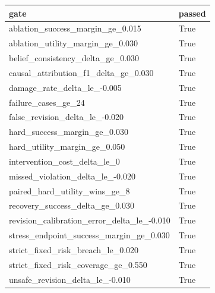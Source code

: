 \begin{tabular}{ll}
\toprule
gate & passed \\
\midrule
ablation\_success\_margin\_ge\_0.015 & True \\
ablation\_utility\_margin\_ge\_0.030 & True \\
belief\_consistency\_delta\_ge\_0.030 & True \\
causal\_attribution\_f1\_delta\_ge\_0.030 & True \\
damage\_rate\_delta\_le\_-0.005 & True \\
failure\_cases\_ge\_24 & True \\
false\_revision\_delta\_le\_-0.020 & True \\
hard\_success\_margin\_ge\_0.030 & True \\
hard\_utility\_margin\_ge\_0.050 & True \\
intervention\_cost\_delta\_le\_0 & True \\
missed\_violation\_delta\_le\_-0.020 & True \\
paired\_hard\_utility\_wins\_ge\_8 & True \\
recovery\_success\_delta\_ge\_0.030 & True \\
revision\_calibration\_error\_delta\_le\_-0.010 & True \\
stress\_endpoint\_success\_margin\_ge\_0.030 & True \\
strict\_fixed\_risk\_breach\_le\_0.020 & True \\
strict\_fixed\_risk\_coverage\_ge\_0.550 & True \\
unsafe\_revision\_delta\_le\_-0.010 & True \\
\bottomrule
\end{tabular}
